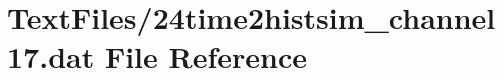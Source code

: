 \hypertarget{24time2histsim__channel17_8dat}{}\section{Text\+Files/24time2histsim\+\_\+channel17.dat File Reference}
\label{24time2histsim__channel17_8dat}
